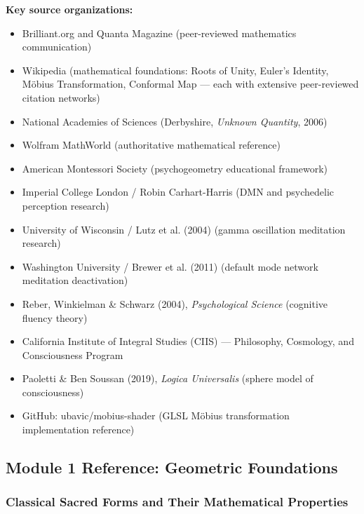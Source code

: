 \documentclass[11pt,letterpaper]{article}
\begin{document}
\textbf{Key source organizations:}
\begin{itemize}[leftmargin=1.5em]
  \item Brilliant.org and Quanta Magazine (peer-reviewed mathematics communication)
  \item Wikipedia (mathematical foundations: Roots of Unity, Euler's Identity, M\"{o}bius Transformation, Conformal Map --- each with extensive peer-reviewed citation networks)
  \item National Academies of Sciences (Derbyshire, \textit{Unknown Quantity}, 2006)
  \item Wolfram MathWorld (authoritative mathematical reference)
  \item American Montessori Society (psychogeometry educational framework)
  \item Imperial College London / Robin Carhart-Harris (DMN and psychedelic perception research)
  \item University of Wisconsin / Lutz et al. (2004) (gamma oscillation meditation research)
  \item Washington University / Brewer et al. (2011) (default mode network meditation deactivation)
  \item Reber, Winkielman \& Schwarz (2004), \textit{Psychological Science} (cognitive fluency theory)
  \item California Institute of Integral Studies (CIIS) --- Philosophy, Cosmology, and Consciousness Program
  \item Paoletti \& Ben Soussan (2019), \textit{Logica Universalis} (sphere model of consciousness)
  \item GitHub: ubavic/mobius-shader (GLSL M\"{o}bius transformation implementation reference)
\end{itemize}

\subsection{Module 1 Reference: Geometric Foundations}

\subsubsection{Classical Sacred Forms and Their Mathematical Properties}
\end{document}
